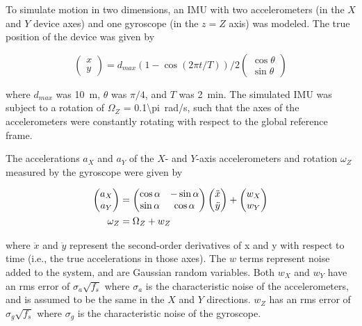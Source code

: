 \documentclass[10pt]{article}
\begin{document}
To simulate motion in two dimensions, an IMU with two accelerometers (in the $X$ and $Y$ device axes) and one gyroscope (in the $z = Z$ axis) was modeled. The true position of the device was given by

\begin{equation}
  \begin{pmatrix}
    x \\ y 
  \end{pmatrix}
  = d_{max} \left( 1 - \cos(2\pi t / T) \right) / 2
  \begin{pmatrix}
    \cos \theta \\ \sin \theta 
  \end{pmatrix}
\end{equation}

where $d_{max}$ was \SI{10}{m}, $\theta$ was $\pi/4$, and $T$ was \SI{2}{min}. The simulated IMU was subject to a rotation of $\Omega_Z$ = \SI{0.1\pi}{rad/s}, such that the axes of the accelerometers were constantly rotating with respect to the global reference frame. 

The accelerations $a_X$ and $a_Y$ of the $X$- and $Y$-axis accelerometers  and rotation $\omega_Z$ measured by the gyroscope were given by 

\begin{align}
\begin{pmatrix}
  a_X \\ a_Y
\end{pmatrix}
&=
\begin{pmatrix}
\cos{\alpha} & -\sin\alpha \\
\sin\alpha & \cos{\alpha}
\end{pmatrix}
\begin{pmatrix}
\ddot x \\ \ddot y
\end{pmatrix}
+
\begin{pmatrix}
w_X \\ w_Y
\end{pmatrix}
\\
\omega_Z &= \Omega_Z + w_Z
\end{align}

where $\ddot x$ and $\ddot y$ represent the second-order derivatives of x and y with respect to time (i.e., the true accelerations in those axes). The $w$ terms represent noise added to the system, and are Gaussian random variables. Both $w_X$ and $w_Y$ have an rms error of $\sigma_a \sqrt{f_s}$ where $\sigma_a$ is the characteristic noise of the accelerometers, and is assumed to be the same in the $X$ and $Y$ directions. $w_Z$ has an rms error of $\sigma_g \sqrt{f_s}$ where $\sigma_g$ is the characteristic noise of the gyroscope.
\end{document}
